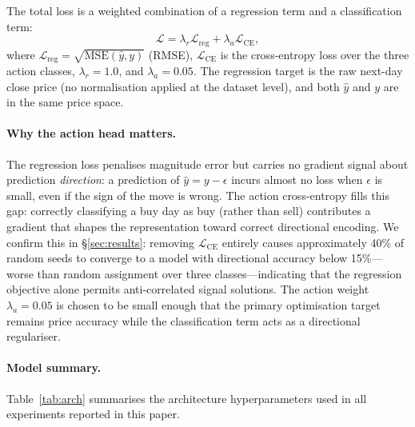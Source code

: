 \documentclass[runningheads]{llncs}
\begin{document}
The total loss is a weighted combination of a regression term and a
classification term:
\begin{equation}
  \mathcal{L} = \lambda_r \mathcal{L}_{\text{reg}} +
                \lambda_a \mathcal{L}_{\text{CE}},
  \label{eq:loss}
\end{equation}
where $\mathcal{L}_{\text{reg}} = \sqrt{\text{MSE}(\hat{y}, y)}$ (RMSE),
$\mathcal{L}_{\text{CE}}$ is the cross-entropy loss over the three action classes,
$\lambda_r = 1.0$, and $\lambda_a = 0.05$.  The regression target is the
raw next-day close price (no normalisation applied at the dataset level), and
both $\hat{y}$ and $y$ are in the same price space.

\paragraph{Why the action head matters.}
The regression loss penalises magnitude error but carries no gradient signal about
prediction \emph{direction}: a prediction of $\hat{y} = y - \epsilon$ incurs
almost no loss when $\epsilon$ is small, even if the sign of the move is wrong.
The action cross-entropy fills this gap: correctly classifying a buy day as buy
(rather than sell) contributes a gradient that shapes the representation toward
correct directional encoding.  We confirm this in \S\ref{sec:results}: removing
$\mathcal{L}_{\text{CE}}$ entirely causes approximately 40\% of random seeds to
converge to a model with directional accuracy below 15\%---worse than random
assignment over three classes---indicating that the regression objective alone
permits anti-correlated signal solutions.  The action weight $\lambda_a = 0.05$
is chosen to be small enough that the primary optimisation target remains price
accuracy while the classification term acts as a directional regulariser.

\paragraph{Model summary.}  Table~\ref{tab:arch} summarises the architecture
hyperparameters used in all experiments reported in this paper.
\end{document}
